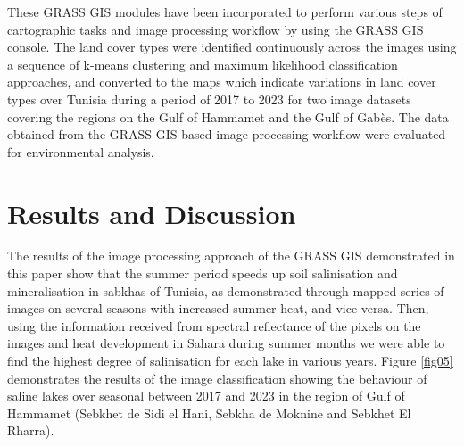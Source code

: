 \documentclass[land,article,submit,pdftex,moreauthors]{Definitions/mdpi}
\begin{document}
These GRASS GIS modules have been incorporated to perform various steps of cartographic tasks and image processing workflow by using the GRASS GIS console. The land cover types were identified continuously across the images using a sequence of k-means clustering and maximum likelihood classification approaches, and converted to the maps which indicate variations in land cover types over Tunisia during a period of 2017 to 2023 for two image datasets covering the regions on the Gulf of Hammamet and the Gulf of Gabès. The data obtained from the GRASS GIS based image processing workflow were evaluated for environmental analysis.

\section{Results and Discussion}

The results of the image processing approach of the GRASS GIS demonstrated in this paper show that the summer period speeds up soil salinisation and mineralisation in sabkhas of Tunisia, as demonstrated through mapped series of images on several seasons with increased summer heat, and vice versa. Then, using the information received from spectral reflectance of the pixels on the images and heat development in Sahara during summer months we were able to find the highest degree of salinisation for each lake in various years. Figure \ref{fig05} demonstrates the results of the image classification showing the behaviour of saline lakes over seasonal between 2017 and 2023 in the region of Gulf of Hammamet (Sebkhet de Sidi el Hani, Sebkha de Moknine and Sebkhet El Rharra). 
\end{document}
